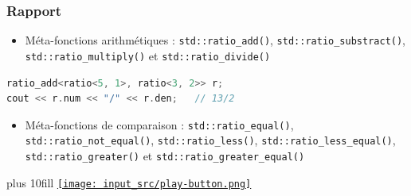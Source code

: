 \documentclass[C++.tex]{subfiles}
\begin{document}
\begin{frame}[fragile]
	\frametitle{Rapport}
	\begin{itemize}
		\item Méta-fonctions arithmétiques : \lstinline|std::ratio_add()|, \lstinline|std::ratio_substract()|, \lstinline|std::ratio_multiply()| et \lstinline|std::ratio_divide()|

	\end{itemize}

	\begin{lstlisting}[language=C++]
ratio_add<ratio<5, 1>, ratio<3, 2>> r;
cout << r.num << "/" << r.den;   // 13/2\end{lstlisting}

	\begin{itemize}
		\item Méta-fonctions de comparaison : \lstinline|std::ratio_equal()|, \lstinline|std::ratio_not_equal()|, \lstinline|std::ratio_less()|, \lstinline|std::ratio_less_equal()|, \lstinline|std::ratio_greater()| et \lstinline|std::ratio_greater_equal()|
	\end{itemize}

	\vskip 10mm plus 10fill
	\hfill
	\href{https://godbolt.org/#g:!((g:!((g:!((h:codeEditor,i:(filename:'1',fontScale:14,fontUsePx:'0',j:1,lang:c%2B%2B,selection:(endColumn:1,endLineNumber:20,positionColumn:1,positionLineNumber:20,selectionStartColumn:1,selectionStartLineNumber:20,startColumn:1,startLineNumber:20),source:'%23include+%3Ciostream%3E%0A%23include+%3Cratio%3E%0A%0Aint+main()%0A%7B%0A++%7B%0A++++std::ratio%3C6,+2%3E+r%3B%0A++++std::cout+%3C%3C+r.num+%3C%3C+!'/!'+%3C%3C+r.den+%3C%3C+!'%5Cn!'%3B%0A++%7D%0A%0A++%7B%0A++++std::ratio_add%3Cstd::ratio%3C6,+2%3E,+std::ratio%3C2,+3%3E%3E+r%3B%0A++++std::cout+%3C%3C+r.num+%3C%3C+!'/!'+%3C%3C+r.den+%3C%3C+!'%5Cn!'%3B%0A++%7D%0A%0A++%7B%0A++++std::cout+%3C%3C+std::boolalpha+%3C%3C+std::ratio_less_equal%3Cstd::ratio%3C6,+2%3E,+std::ratio%3C2,+3%3E%3E::value+%3C%3C+!'%5Cn!'%3B%0A++%7D%0A%7D%0A'),l:'5',n:'0',o:'C%2B%2B+source+%231',t:'0')),k:50,l:'4',n:'0',o:'',s:0,t:'0'),(g:!((h:executor,i:(argsPanelShown:'1',compilationPanelShown:'0',compiler:g112,compilerOutShown:'0',execArgs:'',execStdin:'',fontScale:14,fontUsePx:'0',j:1,lang:c%2B%2B,libs:!((name:boost,ver:'175')),options:'-std%3Dc%2B%2B11',source:1,stdinPanelShown:'1',tree:'1',wrap:'0'),l:'5',n:'0',o:'Executor+x86-64+gcc+11.2+(C%2B%2B,+Editor+%231)',t:'0')),header:(),k:50,l:'4',n:'0',o:'',s:0,t:'0')),l:'2',n:'0',o:'',t:'0')),version:4}{\texttt{[image: input\_src/play-button.png]}}
\end{frame}
\end{document}
